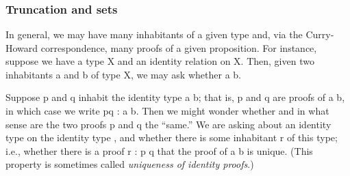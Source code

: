 \begin{code}
\>[0]\AgdaSpace{}%
\AgdaSymbol{:}\AgdaSpace{}%
\AgdaSymbol{\{}\AgdaSpace{}%
\AgdaSpace{}%
\AgdaSymbol{:}\AgdaSpace{}%
\AgdaSymbol{\}}\AgdaSpace{}%
\AgdaSymbol{(}\AgdaSpace{}%
\AgdaSymbol{:}\AgdaSpace{}%
\AgdaSpace{}%
\AgdaSpace{}%
\AgdaSymbol{)}\AgdaSpace{}%
\AgdaSymbol{(}\AgdaSpace{}%
\AgdaSymbol{:}\AgdaSpace{}%
\AgdaSpace{}%
\AgdaSpace{}%
\AgdaSpace{}%
\AgdaSpace{}%
\AgdaSymbol{)}\AgdaSpace{}%
\AgdaSpace{}%
\AgdaSpace{}%
\AgdaSpace{}%
\AgdaSpace{}%
\<%
\\
\>[0]\AgdaSpace{}%
\AgdaSpace{}%
\AgdaSpace{}%
\AgdaSymbol{=}\AgdaSpace{}%
\AgdaSpace{}%
\<%
\\
%
\>[0]\AgdaSpace{}%
\AgdaSpace{}%
\AgdaSpace{}%
\AgdaSpace{}%
\AgdaSpace{}%
\AgdaSpace{}%
\AgdaSymbol{)}\AgdaSpace{}%
\AgdaSymbol{=}\AgdaSpace{}%
\AgdaSpace{}%
\AgdaSpace{}%
\AgdaSpace{}%
\AgdaSpace{}%
\AgdaFunction{,}\AgdaSpace{}%
\<%
\\
\>[0]\AgdaSpace{}%
\AgdaSpace{}%
\<%
\end{code}

\subsubsection{Truncation and sets}\label{Preliminaries.sssec:truncation}
In general, we may have many inhabitants of a given type and, via the Curry-Howard correspondence, many proofs of a given proposition. For instance, suppose we have a type \ab X and an identity relation  on \ab X. Then, given two inhabitants \ab a and \ab b of type \ab X, we may ask whether \ab a  \ab b.

Suppose \ab p and \ab q inhabit the identity type \ab a  b; that is, \ab p and \ab q are proofs of \ab a  \ab b, in which case we write \ab p\ab q : \ab a  \ab b. Then we might wonder whether and in what sense are the two proofs \ab p and \ab q the ``same.'' We are asking about an identity type on the identity type , and whether there is some inhabitant \ab r of this type; i.e., whether there is a proof \ab r : \ab p  \ab q that the proof of \ab a  \ab b is unique. (This property is sometimes called \emph{uniqueness of identity proofs}.)

